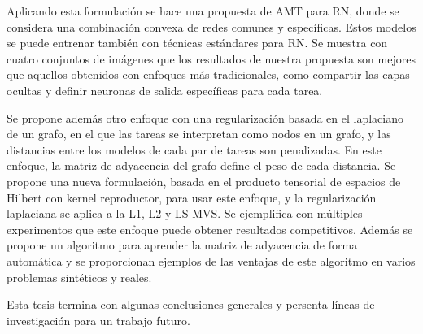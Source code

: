 \documentclass[a4paper, 11pt]{Thesis}  %
\begin{document}
{{  Aplicando esta formulación se hace una propuesta de AMT para RN, donde se considera una combinación convexa de redes comunes y específicas. Estos modelos se puede entrenar también con técnicas estándares para RN. Se muestra con cuatro conjuntos de imágenes que los resultados de nuestra propuesta son mejores que aquellos obtenidos con enfoques más tradicionales, como compartir las capas ocultas y definir neuronas de salida específicas para cada tarea.
  
  Se propone además otro enfoque con una regularización basada en el laplaciano de un grafo, en el que las tareas se interpretan como nodos en un grafo, y las distancias entre los modelos de cada par de tareas son penalizadas. En este enfoque, la matriz de adyacencia del grafo define el peso de cada distancia. Se propone una nueva formulación, basada en el producto tensorial de espacios de Hilbert con kernel reproductor, para usar este enfoque, y la regularización laplaciana se aplica a la L1, L2 y LS-MVS. Se ejemplifica con múltiples experimentos que este enfoque puede obtener resultados competitivos. Además se propone un algoritmo para aprender la matriz de adyacencia de forma automática y se proporcionan ejemplos de las ventajas de este algoritmo en varios problemas sintéticos y reales.
  
  Esta tesis termina con algunas conclusiones generales y persenta líneas de investigación para un trabajo futuro.
  }
}
\clearpage  %
\end{document}
